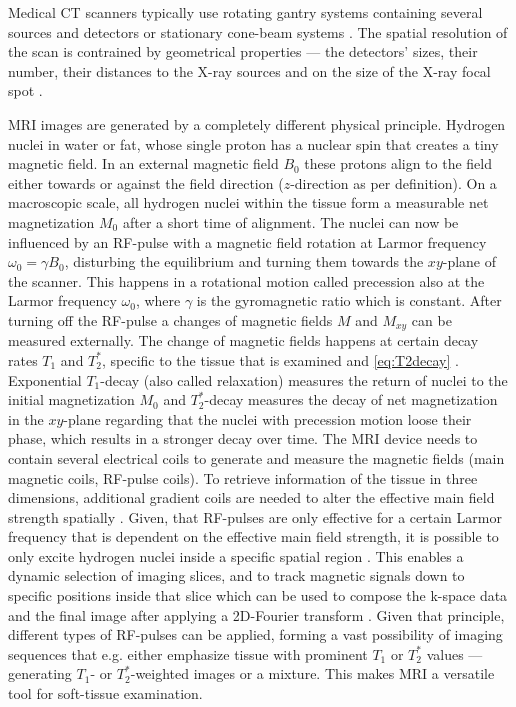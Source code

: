         Medical \ac{CT} scanners typically use rotating gantry systems containing several sources and detectors or stationary cone-beam systems \citep{withers2021x}. The spatial resolution of the scan is contrained by geometrical properties --- the detectors' sizes, their number, their distances to the X-ray sources and on the size of the X-ray focal spot \citep{withers2021x}.

        \ac{MRI} images are generated by a completely different physical principle. Hydrogen nuclei in water or fat, whose single proton has a nuclear spin that creates a tiny magnetic field. In an external magnetic field $B_0$ these protons align to the field either towards or against the field direction \citep{ridgway2010cardiovascular} ($z$-direction as per definition). On a macroscopic scale, all hydrogen nuclei within the tissue form a measurable net magnetization $M_0$ after a short time of alignment. The nuclei can now be influenced by an \ac{RF}-pulse with a magnetic field rotation at Larmor frequency $\omega_0 = \gamma B_0$, disturbing the equilibrium and turning them towards the $xy$-plane of the scanner. This happens in a rotational motion called precession also at the Larmor frequency $\omega_0$, where $\gamma$ is the gyromagnetic ratio which is constant. After turning off the \ac{RF}-pulse a changes of magnetic fields $M$ and $M_{xy}$ can be measured externally. The change of magnetic fields happens at certain decay rates $T_1$ and $T_2^*$, specific to the tissue that is examined  and \eqref{eq:T2decay} \citep{withers2021x}. Exponential $T_1$-decay (also called relaxation) measures the return of nuclei to the initial magnetization $M_0$ and $T_2^*$-decay measures the decay of net magnetization in the $xy$-plane regarding that the nuclei with precession motion loose their phase, which results in a stronger decay over time.
        The MRI device needs to contain several electrical coils to generate and measure the magnetic fields (main magnetic coils, \ac{RF}-pulse coils). To retrieve information of the tissue in three dimensions, additional gradient coils are needed to alter the effective main field strength spatially \citep{ridgway2010cardiovascular}. Given, that \ac{RF}-pulses are only effective for a certain Larmor frequency that is dependent on the effective main field strength, it is possible to only excite hydrogen nuclei inside a specific spatial region \citep{ridgway2010cardiovascular}. This enables a dynamic selection of imaging slices, and to track magnetic signals down to specific positions inside that slice which can be used to compose the k-space data and the final image after applying a \ac{2D}-Fourier transform \citep{ridgway2010cardiovascular}.
        Given that principle, different types of \ac{RF}-pulses can be applied, forming a vast possibility of imaging sequences that e.g. either emphasize tissue with prominent $T_1$ or $T_2^*$ values --- generating $T_1$- or $T_2^*$-weighted images or a mixture. This makes \ac{MRI} a versatile tool for soft-tissue examination.

